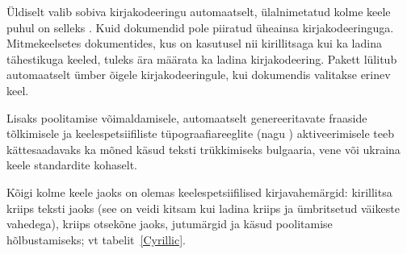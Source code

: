 Üldiselt valib  sobiva kirjakodeeringu automaatselt,
ülalnimetatud kolme keele puhul on selleks . Kuid dokumendid pole
piiratud üheainsa kirjakodeeringuga. Mitmekeelsetes dokumentides, kus on
kasutusel nii kirillitsaga kui ka ladina tähestikuga keeled, tuleks ära
määrata ka ladina kirjakodeering. Pakett  lülitub
automaatselt ümber õigele kirjakodeeringule, kui dokumendis valitakse
erinev keel.

Lisaks poolitamise võimaldamisele, automaatselt genereeritavate fraaside
tõlkimisele ja keelespetsiifiliste tüpograafiareeglite (nagu
) aktiveerimisele teeb  kättesaadavaks ka
mõned käsud teksti trükkimiseks bulgaaria, vene või ukraina keele
standardite kohaselt.

Kõigi kolme keele jaoks on olemas keelespetsiifilised kirjavahemärgid:
kirillitsa kriips teksti jaoks (see on veidi kitsam kui ladina kriips ja
ümbritsetud väikeste vahedega), kriips otsekõne jaoks, jutumärgid ja
käsud poolitamise hõlbustamiseks; vt tabelit~\ref{Cyrillic}.

